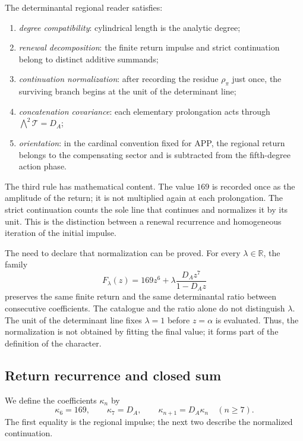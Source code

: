 \begin{definition}
\label{p12-83-c13-s3:def:lector-regional-determinantal}
The determinantal regional reader satisfies:
\begin{enumerate}
  \item \emph{degree compatibility}: cylindrical length is the analytic
  degree;
  \item \emph{renewal decomposition}: the finite return impulse and
  strict continuation belong to distinct additive summands;
  \item \emph{continuation normalization}: after recording the residue
  \(\rho_\pi\) just once, the surviving branch begins at the unit of
  the determinant line;
  \item \emph{concatenation covariance}: each elementary prolongation
  acts through \(\bigwedge^2\mathcal T=D_A\);
  \item \emph{orientation}: in the cardinal convention fixed for APP, the
  regional return belongs to the compensating sector and is subtracted from the fifth-degree
action phase.
\end{enumerate}
\end{definition}

The third rule has mathematical content. The value \(169\) is recorded once as the amplitude of the return; it is not multiplied again at each prolongation. The strict continuation counts the sole line that continues and normalizes it by its unit. This is the distinction between a renewal recurrence and homogeneous iteration of the initial impulse.

The need to declare that normalization can be proved. For every
\(\lambda\in\mathbb R\), the family
\[
F_\lambda(z)
=169z^6+\lambda\frac{D_Az^7}{1-D_Az}
\]
preserves the same finite return and the same determinantal ratio between
consecutive coefficients. The catalogue and the ratio alone do not distinguish
\(\lambda\). The unit of the determinant line fixes
\(\lambda=1\) before \(z=\alpha\) is evaluated. Thus, the normalization
is not obtained by fitting the final value; it forms part of the definition of the
character.

\subsection{Return recurrence and closed sum}

We define the coefficients \(\kappa_n\) by
\[
\kappa_6=169,
\qquad
\kappa_7=D_A,
\qquad
\kappa_{n+1}=D_A\kappa_n\quad(n\ge7).
\]
The first equality is the regional impulse; the next two describe the normalized continuation.

